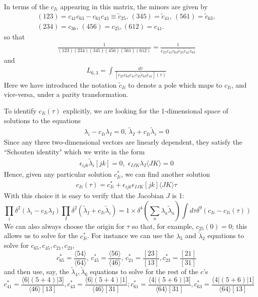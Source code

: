 \documentclass[12pt]{article}
\newcommand{\be}{\begin{eqnarray}}
\newcommand{\ee}{\end{eqnarray}}
\begin{document}
In terms of the $c_{Ii}$ appearing in this matrix, the minors are given by
\begin{eqnarray}
(123) = c_{41} c_{63} - c_{61} c_{43} \equiv \tilde c_{25}, \, (345) = \tilde c_{41}, \, (561) = \tilde c_{63}, \nonumber \\
(234) = c_{36}, \, (456) = c_{25}, (612) = c_{41}.
\end{eqnarray}
so that \be \frac{1}{(123)(234)(345)(456)(561)(612)} =
\frac{1}{c_{25} c_{41} c_{63} \tilde c_{25} \tilde c_{41} \tilde
c_{63}} \ee and \be L_{6,3} = \int \frac{d \tau}{[c_{25}
c_{63} c_{41} \tilde c_{25} \tilde c_{63} \tilde c_{41}](\tau)} \ee
Here we have introduced the notation $\tilde c_{Ii}$ to denote a
pole which maps to $c_{Ii}$, and vice-versa, under a parity
transformation.

To identify $c_{Ii}(\tau)$ explicitly, we are looking for the 1-dimensional space of solutions to the equations
\be
\lambda_i - c_{Ii} \lambda_I= 0, \, \tilde \lambda_I + c_{Ii} \tilde \lambda_i = 0
\ee
Since any three two-dimensional vectors are linearly dependent, they satisfy the ``Schouten identity" which we write in the form
\be
\epsilon_{ijk} \tilde \lambda_i [jk] = 0, \, \, \epsilon_{IJK} \lambda_I \langle J K \rangle = 0
\ee
Hence, given any particular solution $c_{Ii}^*$, we can find another solution
\be
c_{Ii}(\tau) = c_{Ii}^* + \epsilon_{ijk} \epsilon_{IJK} [jk]\langle J K \rangle \tau
\ee
With this choice it is easy to verify that the Jacobian $J$ is 1:
\begin{equation}
\prod_i \delta^2(\lambda_i - c_{Ii}\lambda_I) \prod_I \delta^2(\tilde \lambda_I + c_{Ii} \tilde \lambda_i) = 1 \times \delta^4(\sum_a \lambda_a \tilde \lambda_a) \int d \tau \delta^9 \left(c_{Ii} - c_{Ii}(\tau) \right)
\end{equation}
 We can also always choose the origin for $\tau$ so that, for example, $c_{25}(0) = 0$; this allows us to solve for the $c_{Ii}^*$. For instance we can use the $\lambda_5$ and $\tilde \lambda_2$ equations to solve for $c_{65},c_{45},c_{21},c_{23}$,
\begin{equation}
c^*_{65} = \frac{\langle 5 4 \rangle}{\langle 6 4 \rangle}, \, c^*_{45} = \frac{\langle 5 6 \rangle}{\langle 4 6 \rangle}, \, c^*_{21} = \frac{[23]}{[13]}, c^*_{23} = \frac{[21]}{[31]}
\end{equation}
and then use, say, the $\tilde \lambda_4, \tilde \lambda_6$ equations to solve for the rest of the $c$'s
\begin{equation}
c^*_{41} = \frac{\langle 6 | (5 + 4) |3]}{\langle 4 6 \rangle [1 3]}, c^*_{43} =  \frac{\langle 6 | (5 + 4) |1]}{\langle 4 6 \rangle [3 1]}; c^*_{61} = \frac{\langle 4 | (5 + 6) |3]}{\langle 6 4 \rangle [3 1]}, c^*_{63} = \frac{\langle 4 | (5 + 6) |1]}{\langle 6 4 \rangle [1 3]}
\end{equation}
\end{document}
